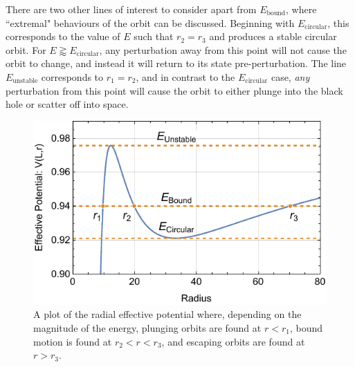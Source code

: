 There are two other lines of interest to consider apart from $E_\text{bound}$, where ``extremal" behaviours of the orbit can be discussed.
Beginning with $E_\text{circular}$, this corresponds to the value of $E$ such that $r_2=r_3$ and produces a stable circular orbit.
For $E\gtrapprox E_\text{circular}$, any perturbation away from this point will not cause the orbit to change, and instead it will return to its state pre-perturbation.
The line $E_\text{unstable}$ corresponds to $r_1=r_2$, and in contrast to the $E_\text{circular}$ case, \textit{any} perturbation from this point will cause the orbit to either plunge into the black hole or scatter off into space.

\begin{figure}[!ht]
    \centering
    \includegraphics{images/RadialPotentialPE.pdf}
    \caption[Schwarzschild radial effective potential plot]{A plot of the radial effective potential where, depending on the magnitude of the energy, plunging orbits are found at $r<r_1$, bound motion is found at $r_2<r<r_3$, and escaping orbits are found at $r>r_3$.}
    \label{fig:radEffPot}
\end{figure}


